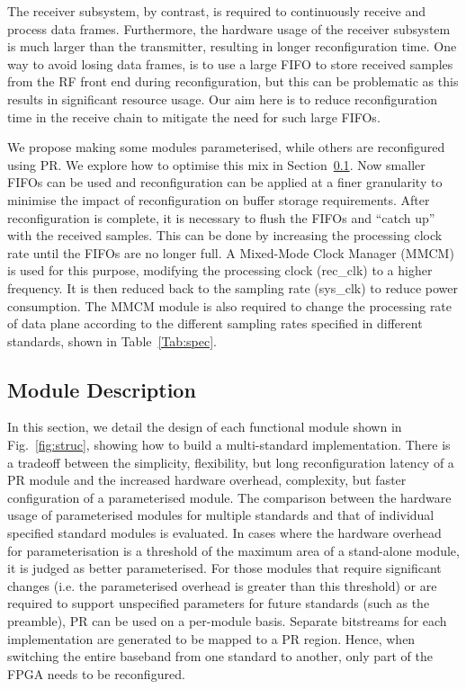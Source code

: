 The receiver subsystem, by contrast, is required to continuously receive and process data frames.
Furthermore, the hardware usage of the receiver subsystem is much larger than the transmitter, resulting in longer reconfiguration time.
One way to avoid losing data frames, is to use a large FIFO to store received samples from the RF front end during reconfiguration, but this can be problematic as this results in significant resource usage.
Our aim here is to reduce reconfiguration time in the receive chain to mitigate the need for such large FIFOs.

We propose making some modules parameterised, while others are reconfigured using PR.
We explore how to optimise this mix in Section~\ref{sec:7module}.
Now smaller FIFOs can be used and reconfiguration can be applied at a finer granularity to minimise the impact of reconfiguration on buffer storage requirements.
After reconfiguration is complete, it is necessary to flush the FIFOs and ``catch up'' with the received samples.
This can be done by increasing the processing clock rate until the FIFOs are no longer full.
A Mixed-Mode Clock Manager (MMCM) is used for this purpose, modifying the processing clock (rec\_clk) to a higher frequency.
It is then reduced back to the sampling rate (sys\_clk) to reduce power consumption.
The MMCM module is also required to change the processing rate of data plane according to the different sampling rates specified in different standards, shown in Table~\ref{Tab:spec}.

\subsection{Module Description}\label{sec:7module}

In this section, we detail the design of each functional module shown in Fig.~\ref{fig:struc}, showing how to build a multi-standard implementation.
There is a tradeoff between the simplicity, flexibility, but long reconfiguration latency of a PR module and the increased hardware overhead, complexity, but faster configuration of a parameterised module.
The comparison between the hardware usage of parameterised modules for multiple standards and that of individual specified standard modules is evaluated.
In cases where the hardware overhead for parameterisation is a threshold of the maximum area of a stand-alone module, it is judged as better parameterised.
For those modules that require significant changes (i.e. the parameterised overhead is greater than this threshold) or are required to support unspecified parameters for future standards (such as the preamble), PR can be used on a per-module basis.
Separate bitstreams for each implementation are generated to be mapped to a PR region.
Hence, when switching the entire baseband from one standard to another, only part of the FPGA needs to be reconfigured.

